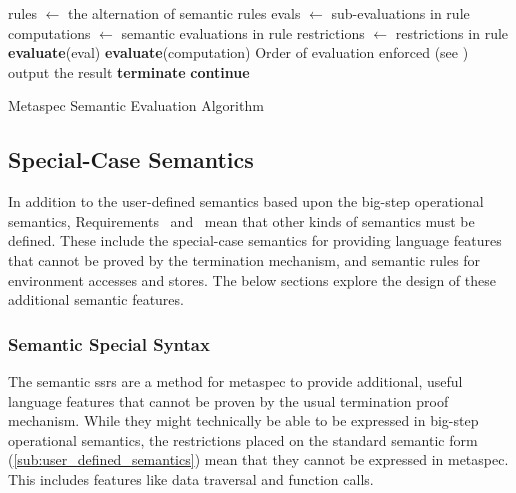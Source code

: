 \begin{algorithm}
\begin{algorithmic}
\State rules $\gets$ the alternation of semantic rules
\State
{}
    \State evals $\gets$ sub-evaluations in rule
    \State computations $\gets$ semantic evaluations in rule
    \State restrictions $\gets$ restrictions in rule
    \State 
        \State \textbf{evaluate}(eval)
    \EndFor
    \State
            \State \textbf{evaluate}(computation)
            \Comment Order of evaluation enforced (see )
        \EndFor
        \State
        \State output the result
        \State \textbf{terminate}
    \Else
        \State \textbf{continue}
    \EndIf
\EndFor
\end{algorithmic}
\caption{Metaspec Semantic Evaluation Algorithm}
\label{alg:metaspec_semantic_evaluation_algorithm}
\end{algorithm}



\subsection{Special-Case Semantics} %
\label{sub:special_case_semantics}
In addition to the user-defined semantics based upon the big-step operational semantics, Requirements~ and~ mean that other kinds of semantics must be defined.
These include the special-case semantics for providing language features that cannot be proved by the termination mechanism, and semantic rules for environment accesses and stores.
The below sections explore the design of these additional semantic features.

\subsubsection{Semantic Special Syntax} %
\label{ssub:semantic_special_syntax}
The semantic \glspl{ssr} are a method for \gls{metaspec} to provide additional, useful language features that cannot be proven by the usual termination proof mechanism. 
While they might technically be able to be expressed in big-step operational semantics, the restrictions placed on the standard semantic form (\autoref{sub:user_defined_semantics}) mean that they cannot be expressed in metaspec.
This includes features like data traversal and function calls. \\

